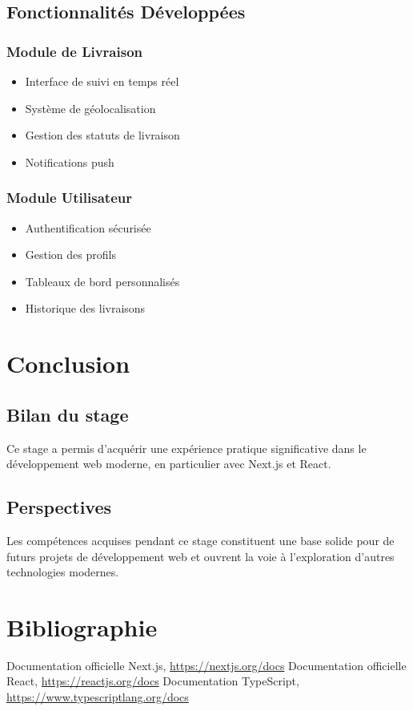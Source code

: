 \documentclass[12pt,a4paper]{report}
\begin{document}
\section{Fonctionnalités Développées}
\subsection{Module de Livraison}
\begin{itemize}
    \item Interface de suivi en temps réel
    \item Système de géolocalisation
    \item Gestion des statuts de livraison
    \item Notifications push
\end{itemize}

\subsection{Module Utilisateur}
\begin{itemize}
    \item Authentification sécurisée
    \item Gestion des profils
    \item Tableaux de bord personnalisés
    \item Historique des livraisons
\end{itemize}

\chapter{Conclusion}
\section{Bilan du stage}
Ce stage a permis d'acquérir une expérience pratique significative dans le développement web moderne, en particulier avec Next.js et React.

\section{Perspectives}
Les compétences acquises pendant ce stage constituent une base solide pour de futurs projets de développement web et ouvrent la voie à l'exploration d'autres technologies modernes.

\chapter*{Bibliographie}
\begin{thebibliography}{9}
 Documentation officielle Next.js, \url{https://nextjs.org/docs}
 Documentation officielle React, \url{https://reactjs.org/docs}
 Documentation TypeScript, \url{https://www.typescriptlang.org/docs}
\end{thebibliography}
\end{document}
